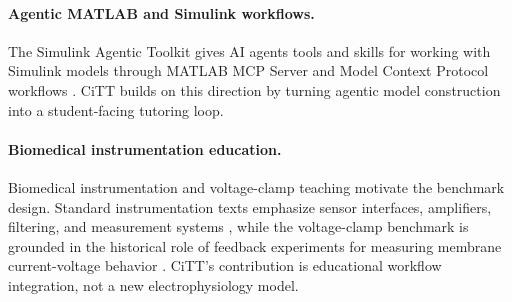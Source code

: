 \paragraph{Agentic MATLAB and Simulink workflows.}
The Simulink Agentic Toolkit gives AI agents tools and skills for working with Simulink models through MATLAB MCP Server and Model Context Protocol workflows \cite{mathworks_satk,matlab_agentic_toolkit}. CiTT builds on this direction by turning agentic model construction into a student-facing tutoring loop.

\paragraph{Biomedical instrumentation education.}
Biomedical instrumentation and voltage-clamp teaching motivate the benchmark design. Standard instrumentation texts emphasize sensor interfaces, amplifiers, filtering, and measurement systems \cite{webster_medical_instrumentation_2020}, while the voltage-clamp benchmark is grounded in the historical role of feedback experiments for measuring membrane current-voltage behavior \cite{hodgkin_huxley_katz_1952}. CiTT's contribution is educational workflow integration, not a new electrophysiology model.

